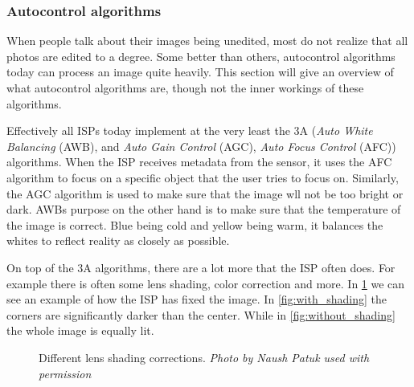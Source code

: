 \subsubsection{Autocontrol algorithms} \label{section:autocontrol}

When people talk about their images being unedited, most do not realize that all
photos are edited to a degree. Some better than others, autocontrol algorithms
today can process an image quite heavily. This section will give an overview of
what autocontrol algorithms are, though not the inner workings of these
algorithms.

Effectively all ISPs today implement at the very least the 3A (\textit{Auto
White Balancing} (AWB), and \textit{Auto Gain Control} (AGC), \textit{Auto
Focus Control} (AFC)) algorithms. When the ISP receives metadata from the
sensor, it uses the AFC algorithm to focus on a specific object that the user
tries to focus on. Similarly, the AGC algorithm is used to make sure that the
image wll not be too bright or dark. AWBs purpose on the other hand is to make
sure that the temperature of the image is correct. Blue being cold and yellow
being warm, it balances the whites to reflect reality as closely as possible.

On top of the 3A algorithms, there are a lot more that the ISP often does. For
example there is often some lens shading, color correction and more. In
\cref{fig:lens_shading} we can see an example of how the ISP has fixed the image.
In \cref{fig:with_shading} the corners are significantly darker than the center.
While in \cref{fig:without_shading} the whole image is equally lit.

\begin{figure}[htpb]
    \centering
    \qquad

    \caption{Different lens shading corrections. \textit{Photo by Naush Patuk used with permission}}\label{fig:lens_shading}
\end{figure}

